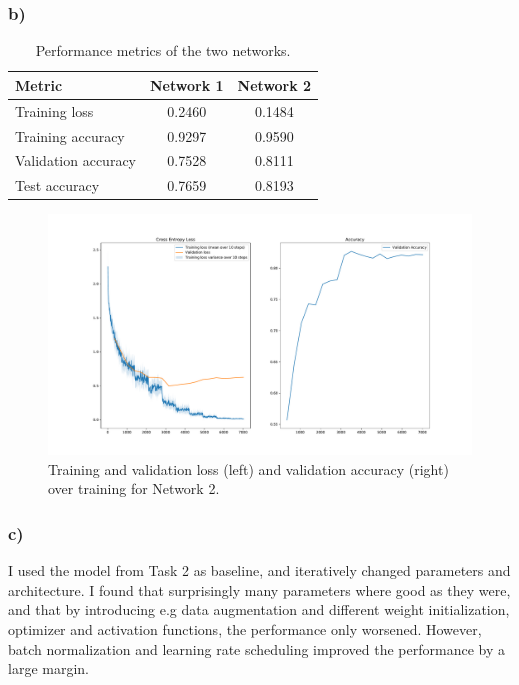 \subsubsection*{b)}

\begin{table}[h!]
  \centering
  \begin{tabular}{|l|c|c|}
    \hline
    Metric & Network 1 & Network 2 \\
    \hline
    Training loss & 0.2460 & 0.1484 \\
    Training accuracy & 0.9297 & 0.9590 \\
    Validation accuracy & 0.7528 & 0.8111 \\
    Test accuracy & 0.7659 & 0.8193 \\
    \hline
  \end{tabular}
  \caption{Performance metrics of the two networks.}
  \label{tab:task3:performance}
\end{table}

\begin{figure}[h!]
  \centering
  \includegraphics[clip, trim = 3cm 0cm 3cm 0cm, width=\textwidth]{figures/Task3b.pdf}
  \caption{Training and validation loss (left) and validation accuracy (right) over training for Network 2.}
  \label{fig:task3:b}
\end{figure}


\subsubsection*{c)}

I used the model from Task 2 as baseline, and iteratively changed parameters and architecture. I found that surprisingly many parameters where good as they were, and that by introducing e.g data augmentation and different weight initialization, optimizer and activation functions, the performance only worsened. However, batch normalization and learning rate scheduling improved the performance by a large margin.

